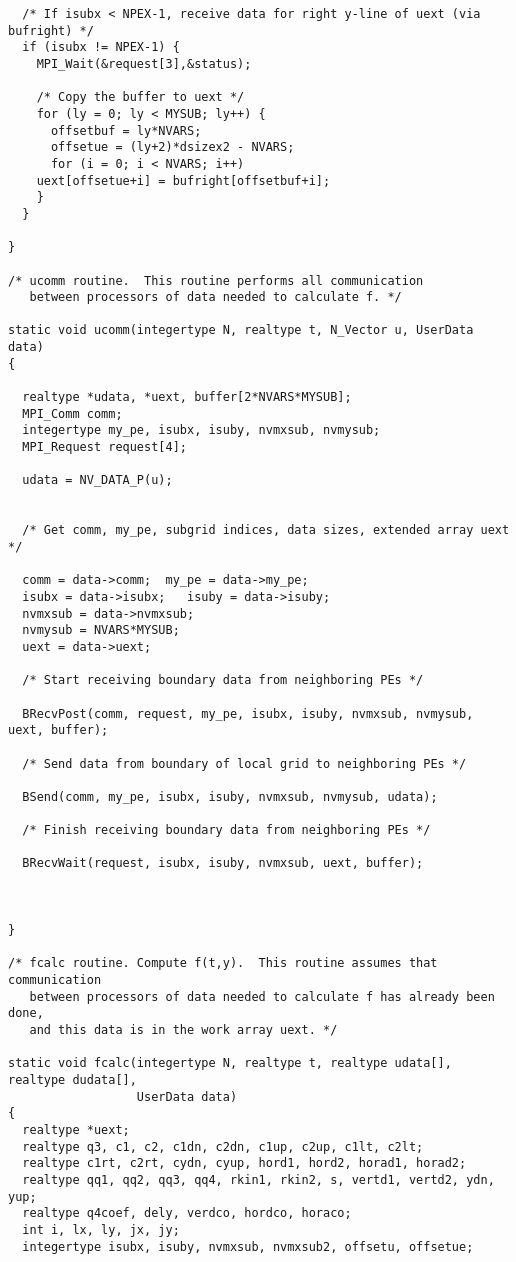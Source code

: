 \begin{verbatim}
  /* If isubx < NPEX-1, receive data for right y-line of uext (via bufright) */
  if (isubx != NPEX-1) {
    MPI_Wait(&request[3],&status);

    /* Copy the buffer to uext */
    for (ly = 0; ly < MYSUB; ly++) {
      offsetbuf = ly*NVARS;
      offsetue = (ly+2)*dsizex2 - NVARS;
      for (i = 0; i < NVARS; i++)
    uext[offsetue+i] = bufright[offsetbuf+i];
    }
  }

}

/* ucomm routine.  This routine performs all communication 
   between processors of data needed to calculate f. */

static void ucomm(integertype N, realtype t, N_Vector u, UserData data)
{

  realtype *udata, *uext, buffer[2*NVARS*MYSUB];
  MPI_Comm comm;
  integertype my_pe, isubx, isuby, nvmxsub, nvmysub;
  MPI_Request request[4];

  udata = NV_DATA_P(u);


  /* Get comm, my_pe, subgrid indices, data sizes, extended array uext */

  comm = data->comm;  my_pe = data->my_pe;
  isubx = data->isubx;   isuby = data->isuby;
  nvmxsub = data->nvmxsub;
  nvmysub = NVARS*MYSUB;
  uext = data->uext;

  /* Start receiving boundary data from neighboring PEs */

  BRecvPost(comm, request, my_pe, isubx, isuby, nvmxsub, nvmysub, uext, buffer);

  /* Send data from boundary of local grid to neighboring PEs */

  BSend(comm, my_pe, isubx, isuby, nvmxsub, nvmysub, udata);

  /* Finish receiving boundary data from neighboring PEs */

  BRecvWait(request, isubx, isuby, nvmxsub, uext, buffer);



}

/* fcalc routine. Compute f(t,y).  This routine assumes that communication 
   between processors of data needed to calculate f has already been done,
   and this data is in the work array uext. */

static void fcalc(integertype N, realtype t, realtype udata[], realtype dudata[],
                  UserData data)
{
  realtype *uext;
  realtype q3, c1, c2, c1dn, c2dn, c1up, c2up, c1lt, c2lt;
  realtype c1rt, c2rt, cydn, cyup, hord1, hord2, horad1, horad2;
  realtype qq1, qq2, qq3, qq4, rkin1, rkin2, s, vertd1, vertd2, ydn, yup;
  realtype q4coef, dely, verdco, hordco, horaco;
  int i, lx, ly, jx, jy;
  integertype isubx, isuby, nvmxsub, nvmxsub2, offsetu, offsetue;


\end{verbatim}
